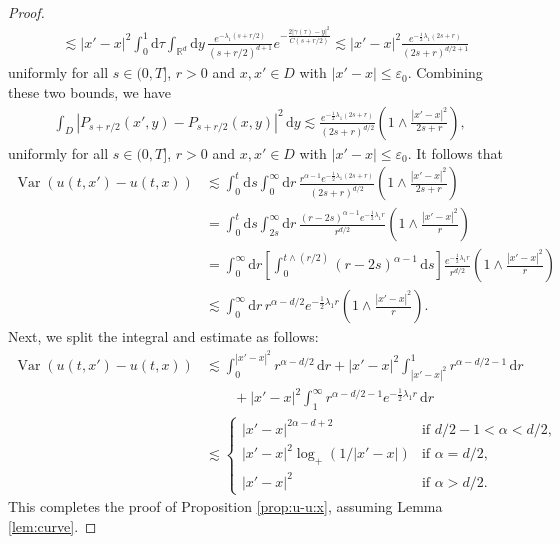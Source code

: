 \documentclass[reqno]{amsart}
\DeclareMathOperator{\Var}{Var}
\newcommand{\R}{\mathbb R}
\renewcommand{\d}{\mathrm d}
\newcommand{\1}{\mathbf 1}
\numberwithin{equation}{section}
\theoremstyle{definition}
\begin{document}
\begin{proof}
\begin{align*}
	& \lesssim |x'-x|^2 \int_0^1 \d \tau \int_{\R^d} \d y \, \frac{e^{-\lambda_1(s+r/2)}}{(s+r/2)^{d+1}} e^{- \frac{2|\gamma(\tau)-y|^2}{C(s+r/2)}}
	\lesssim |x'-x|^2 \frac{e^{-\frac12 \lambda_1 (2s+r)}}{(2s+r)^{d/2+1}}
\end{align*}
uniformly for all $s \in (0,T]$, $r>0$ and $x,x' \in D$ with $|x'-x| \le \varepsilon_0$.
Combining these two bounds, we have
\begin{align*}
	\int_D |P_{s+r/2}(x',y)-P_{s+r/2}(x,y)|^2 \, \d y
	\lesssim
	 \frac{e^{-\frac12 \lambda_1 (2s+r)}}{(2s+r)^{d/2}} \left( 1 \wedge \frac{|x'-x|^2}{2s+r} \right),
\end{align*}
uniformly for all $s \in (0,T]$, $r>0$ and $x,x' \in D$ with $|x'-x| \le \varepsilon_0$. 
It follows that
\begin{align*}
	\Var(u(t,x')-u(t,x))
	& \lesssim \int_0^t \d s \int_0^\infty \d r \,\frac{r^{\alpha-1} e^{-\frac12\lambda_1(2s+r)}}{(2s+r)^{d/2}} \left( 1 \wedge \frac{|x'-x|^2}{2s+r} \right)\\
	&=\int_0^t \d s \int_{2s}^\infty \d r \,\frac{(r-2s)^{\alpha-1} e^{-\frac12\lambda_1r}}{r^{d/2}} \left( 1 \wedge \frac{|x'-x|^2}{r} \right)\\
	&=\int_0^\infty \d r \left[\int_0^{t \wedge (r/2)} (r-2s)^{\alpha-1} \, \d s \right] \frac{e^{-\frac12 \lambda_1r}}{r^{d/2}} \left( 1 \wedge \frac{|x'-x|^2}{r}\right)\\
	& \lesssim \int_0^\infty \d r \, r^{\alpha-d/2} e^{-\frac12 \lambda_1 r} \left( 1 \wedge \frac{|x'-x|^2}{r}\right).
\end{align*}
Next, we split the integral and estimate as follows:
\begin{align*}
	\Var(u(t,x')-u(t,x))
	& \lesssim \int_0^{|x'-x|^2} r^{\alpha-d/2} \, \d r + |x'-x|^2 \int_{|x'-x|^2}^1 r^{\alpha-d/2-1} \, \d r\\
	& \qquad  + |x'-x|^2 \int_1^\infty r^{\alpha-d/2-1} e^{-\frac12 \lambda_1 r} \, \d r\\
	& \lesssim \begin{cases}
	|x'-x|^{2\alpha-d+2} & \text{if $d/2-1<\alpha<d/2$,}\\
	|x'-x|^2 \log_+(1/|x'-x|) & \text{if $\alpha=d/2$,}\\
	|x'-x|^2 & \text{if $\alpha>d/2$.}
	\end{cases}
\end{align*}
This completes the proof of Proposition \ref{prop:u-u:x}, assuming Lemma \ref{lem:curve}.
\end{proof}
\end{document}
